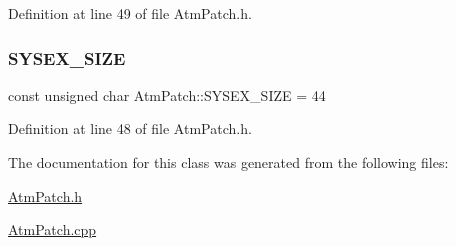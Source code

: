 Definition at line 49 of file Atm\+Patch.\+h.

\mbox{\label{class_atm_patch_a042c0c97fac54f61b229ad08e71037cb}} 
\subsubsection{\texorpdfstring{S\+Y\+S\+E\+X\+\_\+\+S\+I\+ZE}{SYSEX\_SIZE}}
{\footnotesize\ttfamily const unsigned char Atm\+Patch\+::\+S\+Y\+S\+E\+X\+\_\+\+S\+I\+ZE = 44\hspace{0.3cm}{\ttfamily [static]}}



Definition at line 48 of file Atm\+Patch.\+h.



The documentation for this class was generated from the following files\+:\begin{DoxyCompactItemize}
\item 
\hyperlink{_atm_patch_8h}{Atm\+Patch.\+h}\item 
\hyperlink{_atm_patch_8cpp}{Atm\+Patch.\+cpp}\end{DoxyCompactItemize}
